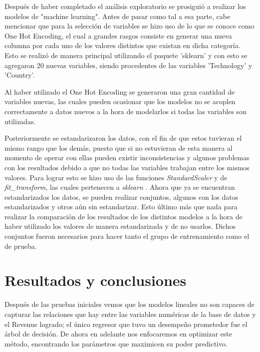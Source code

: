 \documentclass{article}
\begin{document}
        Después de haber completado el análisis exploratorio se prosiguió a realizar los modelos de "machine learning". Antes de pasar como tal a esa parte, cabe mencionar que para la selección de variables se hizo uso de lo que se conoce como One Hot Encoding, el cual a grandes rasgos consiste en generar una nueva columna por cada uno de los valores distintos que existan en dicha categoría. Esto se realizó de manera principal utilizando el paquete 'sklearn' y con esto se agregaron 20 nuevas variables, siendo procedentes de las variables 'Technology' y 'Country'.

        \vspace{4mm}

        Al haber utilizado el One Hot Encoding se generaron una gran cantidad de variables nuevas, las cuales pueden ocasionar que los modelos no se acoplen correctamente a datos nuevos a la hora de modelarlos si todas las variables son utilizadas.

        \vspace{4mm}

        Posteriormente se estandarizaron los datos, con el fin de que estos tuvieran el mismo rango que los demás, puesto que si no estuvieran de esta manera al momento de operar con ellas pueden existir inconsistencias y algunos problemas con los resultados debido a que no todas las variables trabajan entre los mismos valores. Para lograr esto se hizo uso de las funciones \emph{StandardScaler} y de \emph{fit\_transform}, las cuales pertenecen a \emph{sklearn} \parencite{scikit-learn}. Ahora que ya se encuentran estandarizados los datos, se pueden realizar conjuntos, algunos con los datos estandarizados y otros aún sin estandarizar. Esto último más que nada para realizar la comparación de los resultados de los distintos modelos a la hora de haber utilizado los valores de manera estandarizada y de no usarlos. Dichos conjuntos fueron necesarios para hacer tanto el grupo de entrenamiento como el de prueba.

    \section{Resultados y conclusiones}
        Después de las pruebas iniciales vemos que los modelos lineales no son capaces de capturar las relaciones que hay entre las variables numéricas de la base de datos y el Revenue logrado; el único regresor que tuvo un desempeño prometedor fue el árbol de decisión. De ahora en adelante nos enfocaremos en optimizar este método, encontrando los parámetros que maximicen su poder predictivo.
\end{document}
